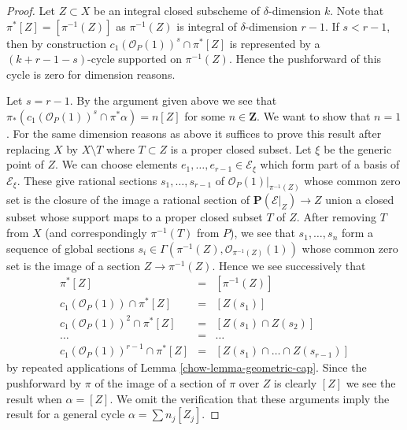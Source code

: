 \begin{proof}

Let $Z \subset X$ be an integral closed subscheme of $\delta$-dimension $k$.
Note that $\pi^*[Z] = [\pi^{-1}(Z)]$ as $\pi^{-1}(Z)$ is integral of
$\delta$-dimension $r - 1$.
If $s < r - 1$, then by construction
$c_1(\mathcal{O}_P(1))^s \cap \pi^*[Z]$
is represented by a $(k + r - 1 - s)$-cycle supported on
$\pi^{-1}(Z)$. Hence the pushforward of this cycle
is zero for dimension reasons.

\medskip\noindent
Let $s = r - 1$. By the argument given above we see that
$\pi_*(c_1(\mathcal{O}_P(1))^s \cap \pi^*\alpha) = n [Z]$
for some $n \in \mathbf{Z}$. We want to show that $n = 1$.
For the same dimension reasons
as above it suffices to prove this result after replacing $X$ by
$X \setminus T$ where $T \subset Z$ is a proper closed subset.
Let $\xi$ be the generic point of $Z$.
We can choose elements $e_1, \ldots, e_{r - 1} \in \mathcal{E}_\xi$
which form part of a basis of $\mathcal{E}_\xi$.
These give rational sections $s_1, \ldots, s_{r - 1}$
of $\mathcal{O}_P(1)|_{\pi^{-1}(Z)}$ whose common zero set
is the closure of the image a rational section of
$\mathbf{P}(\mathcal{E}|_Z) \to Z$ union a closed subset whose
support maps to a proper closed subset $T$ of $Z$.
After removing $T$ from $X$ (and correspondingly $\pi^{-1}(T)$
from $P$), we see that $s_1, \ldots, s_n$ form a sequence
of global sections
$s_i \in \Gamma(\pi^{-1}(Z), \mathcal{O}_{\pi^{-1}(Z)}(1))$
whose common zero set is the image of a section $Z \to \pi^{-1}(Z)$.
Hence we see successively that
\begin{eqnarray*}
\pi^*[Z] & = & [\pi^{-1}(Z)] \\
c_1(\mathcal{O}_P(1)) \cap \pi^*[Z] & = & [Z(s_1)] \\
c_1(\mathcal{O}_P(1))^2 \cap \pi^*[Z] & = & [Z(s_1) \cap Z(s_2)] \\
\ldots & = & \ldots \\
c_1(\mathcal{O}_P(1))^{r - 1} \cap \pi^*[Z] & = &
[Z(s_1) \cap \ldots \cap Z(s_{r - 1})]
\end{eqnarray*}
by repeated applications of Lemma \ref{chow-lemma-geometric-cap}.
Since the pushforward by $\pi$ of the image of a
section of $\pi$ over $Z$ is clearly $[Z]$ we see the result
when $\alpha = [Z]$. We omit the verification that these
arguments imply the result for a general cycle $\alpha = \sum n_j [Z_j]$.
\end{proof}

